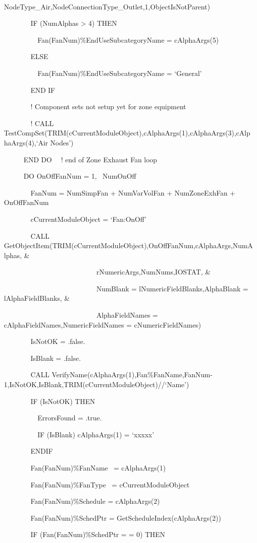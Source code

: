 ~~~~~~~~~~~~~~~~~~~~~~~~~~~ NodeType\_Air,NodeConnectionType\_Outlet,1,ObjectIsNotParent)

~~~~~~~ IF (NumAlphas \textgreater{} 4) THEN

~~~~~~~~~ Fan(FanNum)\%EndUseSubcategoryName = cAlphaArgs(5)

~~~~~~~ ELSE

~~~~~~~~~ Fan(FanNum)\%EndUseSubcategoryName = `General'

~~~~~~~ END IF

~~~~~~~ ! Component sets not setup yet for zone equipment

~~~~~~~ ! CALL TestCompSet(TRIM(cCurrentModuleObject),cAlphaArgs(1),cAlphaArgs(3),cAlphaArgs(4),`Air Nodes')

~~~~~ END DO~~ ! end of Zone Exhaust Fan loop

~~~~~ DO OnOffFanNum = 1,~ NumOnOff

~~~~~~~ FanNum = NumSimpFan + NumVarVolFan + NumZoneExhFan + OnOffFanNum

~~~~~~~ cCurrentModuleObject = `Fan:OnOff'

~~~~~~~ CALL GetObjectItem(TRIM(cCurrentModuleObject),OnOffFanNum,cAlphaArgs,NumAlphas, \&

~~~~~~~~~~~~~~~~~~~~~~~~~~ rNumericArgs,NumNums,IOSTAT, \&

~~~~~~~~~~~~~~~~~~~~~~~~~~ NumBlank = lNumericFieldBlanks,AlphaBlank = lAlphaFieldBlanks, \&

~~~~~~~~~~~~~~~~~~~ ~~~~~~~AlphaFieldNames = cAlphaFieldNames,NumericFieldNames = cNumericFieldNames)

~~~~~~~ IsNotOK = .false.

~~~~~~~ IsBlank = .false.

~~~~~~~ CALL VerifyName(cAlphaArgs(1),Fan\%FanName,FanNum-1,IsNotOK,IsBlank,TRIM(cCurrentModuleObject)//`Name')

~~~~~~~ IF (IsNotOK) THEN

~~~~~~~~~ ErrorsFound = .true.

~~~~~~~~~ IF (IsBlank) cAlphaArgs(1) = `xxxxx'

~~~~~~~ ENDIF

~~~~~~~ Fan(FanNum)\%FanName~ = cAlphaArgs(1)

~~~~~~~ Fan(FanNum)\%FanType~ = cCurrentModuleObject

~~~~~~~ Fan(FanNum)\%Schedule = cAlphaArgs(2)

~~~~~~~ Fan(FanNum)\%SchedPtr = GetScheduleIndex(cAlphaArgs(2))

~~~~~~~ IF (Fan(FanNum)\%SchedPtr = = 0) THEN

